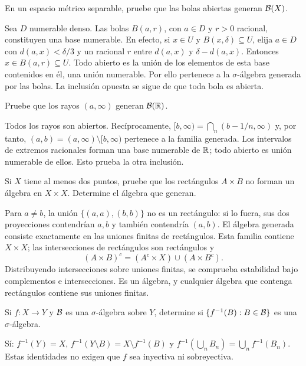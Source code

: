 \begin{ejercicio}\label{ej:v2-l01-6}
En un espacio métrico separable, pruebe que las bolas abiertas generan $\mathcal B(X)$.
\end{ejercicio}
\begin{solucion}
Sea $D$ numerable denso. Las bolas $B(a,r)$, con $a\in D$ y $r>0$ racional, constituyen una base numerable. En efecto, si $x\in U$ y $B(x,\delta)\subseteq U$, elija $a\in D$ con $d(a,x)<\delta/3$ y un racional $r$ entre $d(a,x)$ y $\delta-d(a,x)$. Entonces $x\in B(a,r)\subseteq U$. Todo abierto es la unión de los elementos de esta base contenidos en él, una unión numerable. Por ello pertenece a la $\sigma$-álgebra generada por las bolas. La inclusión opuesta se sigue de que toda bola es abierta.
\end{solucion}

\begin{ejercicio}\label{ej:v2-l01-7}
Pruebe que los rayos $(a,\infty)$ generan $\mathcal B(\mathbb R)$.
\end{ejercicio}
\begin{solucion}
Todos los rayos son abiertos. Recíprocamente, $[b,\infty)=\bigcap_n(b-1/n,\infty)$ y, por tanto, $(a,b)=(a,\infty)\setminus[b,\infty)$ pertenece a la familia generada. Los intervalos de extremos racionales forman una base numerable de $\mathbb R$; todo abierto es unión numerable de ellos. Esto prueba la otra inclusión.
\end{solucion}

\begin{ejercicio}\label{ej:v2-l01-8}
Si $X$ tiene al menos dos puntos, pruebe que los rectángulos $A\times B$ no forman un álgebra en $X\times X$. Determine el álgebra que generan.
\end{ejercicio}
\begin{solucion}
Para $a\ne b$, la unión $\{(a,a),(b,b)\}$ no es un rectángulo: si lo fuera, sus dos proyecciones contendrían $a,b$ y también contendría $(a,b)$. El álgebra generada consiste exactamente en las uniones finitas de rectángulos. Esta familia contiene $X\times X$; las intersecciones de rectángulos son rectángulos y
\[(A\times B)^c=(A^c\times X)\cup(A\times B^c).\]
Distribuyendo intersecciones sobre uniones finitas, se comprueba estabilidad bajo complementos e intersecciones. Es un álgebra, y cualquier álgebra que contenga rectángulos contiene sus uniones finitas.
\end{solucion}

\begin{ejercicio}\label{ej:v2-l01-9}
Si $f:X\to Y$ y $\mathcal B$ es una $\sigma$-álgebra sobre $Y$, determine si $\{f^{-1}(B):B\in\mathcal B\}$ es una $\sigma$-álgebra.
\end{ejercicio}
\begin{solucion}
Sí: $f^{-1}(Y)=X$, $f^{-1}(Y\setminus B)=X\setminus f^{-1}(B)$ y $f^{-1}(\bigcup_nB_n)=\bigcup_nf^{-1}(B_n)$. Estas identidades no exigen que $f$ sea inyectiva ni sobreyectiva.
\end{solucion}

